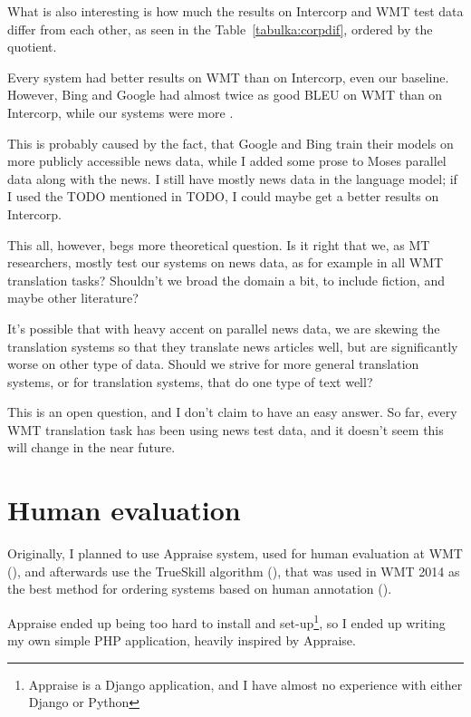 What is also interesting is how much the results on Intercorp and WMT test data differ from each other, as seen in the Table~\ref{tabulka:corpdif}, ordered by the quotient.  

Every system had better results on WMT than on Intercorp, even our baseline. However, Bing and Google had almost twice as good BLEU on WMT than on Intercorp, while our systems were more .

This is probably caused by the fact, that Google and Bing train their models on more publicly accessible news data, while I added some prose to Moses parallel data along with the news. I still have mostly news data in the language model; if I used the TODO mentioned in TODO, I could maybe get a better results on Intercorp.

This all, however, begs more theoretical question. 
Is it right that we, as MT researchers, mostly test our systems on news data, as for example in all WMT translation tasks? 
Shouldn't we broad the domain a bit, to include fiction, and maybe other literature? 

It's possible that with heavy accent on parallel news data, we are skewing the translation systems so that they translate news articles well, but are significantly worse on other type of data. Should we strive for more general translation systems, or for translation systems, that do one type of text well?

This is an open question, and I don't claim to have an easy answer. So far, every WMT translation task has been using news test data, and it doesn't seem this will change in the near future.

\section{Human evaluation}


Originally, I planned to use Appraise system, used for human evaluation at WMT (\cite{appraise}), and afterwards use the TrueSkill algorithm (\cite{trueskill}), that was used in WMT 2014 as the best method for ordering systems based on human annotation (\cite{wmt_findings_2014}). 

Appraise ended up being too hard to install and set-up\footnote{Appraise is a Django application, and I have almost no experience with either Django or Python}, so I ended up writing my own simple PHP application, heavily inspired by Appraise. 

